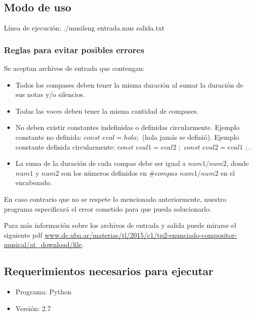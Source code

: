 \subsection{Modo de uso}
Línea de ejecución: ./musileng entrada.mus salida.txt

\subsubsection{Reglas para evitar posibles errores}
Se aceptan archivos de entrada que contengan:
\begin{itemize}
\item Todos los compases deben tener la misma duración al sumar la duración de sus notas y/o silencios.
\item Todas las voces deben tener la misma cantidad de compases.
\item No deben existir constantes indefinidas o definidas circularmente. Ejemplo constante no definida: $const$ $eval = hola;$ (hola jamás se definió). Ejemplo constante definida circularmente: $const$ $eval1 = eval2$ $;$ $const$ $eval2 = eval1$ $;$.
\item La suma de la duración de cada compas debe ser igual a $num1/num2$, donde $num1$ y $num2$ son los números definidos en $\#compas$ $num1/num2$ en el encabezado.
\end{itemize}
En caso contrario que no se respete lo mencionado anteriormente, nuestro programa especificará el error cometido para que pueda solucionarlo.

Para más información sobre los archivos de entrada y salida puede mirarse el siguiente pdf \url{www.dc.uba.ar/materias/tl/2015/c1/tp2-enunciado-compositor-musical/at_download/file}.

\subsection{Requerimientos necesarios para ejecutar}
\begin{itemize}
\item Programa: Python
\item Versión: 2.7
\end{itemize}

